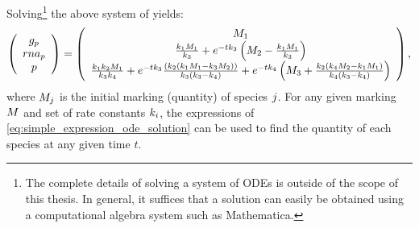 Solving\footnote{The complete details of solving a system of ODEs is outside of the scope of this thesis. In general, it suffices that a solution can easily be obtained using a computational algebra system such as Mathematica\supercite{Wolfram:11Mat}.} the above system of  yields:
\begin{gather}\label{eq:simple_expression_ode_solution}
    \left( \begin{array}{c}
        \con{g_p} \\
        \con{rna_p} \\
        \con{p}
    \end{array} \right) =
%
    \left( \begin{array}{c}
        \markmat_1 \\
        \frac{\condetx{1} \markmat_1}{\condetx{3}} + e^{-t \condetx{3}}\left( \markmat_2-\frac{\condetx{1} \markmat_1}{\condetx{3}} \right) \\
        \frac{\condetx{1} \condetx{2} \markmat_1}{\condetx{3} \condetx{4}} + e^{-t \condetx{3}}\frac{\left(\condetx{2} \left(\condetx{1} \markmat_1-\condetx{3} \markmat_2\right)\right)}{\condetx{3} \left(\condetx{3}-\condetx{4}\right)} + e^{-t \condetx{4}} \left(\markmat_3 + \frac{\condetx{2} \left(\condetx{4} \markmat_2-\condetx{1} \markmat_1\right)}{\condetx{4} \left(\condetx{3}-\condetx{4}\right)}\right)
    \end{array} \right),
\end{gather}
where $M_j$ is the initial marking (\ie quantity) of species $j$. For any given marking $M$ and set of rate constants $k_{i}$, the expressions of \eqref{eq:simple_expression_ode_solution} can be used to find the quantity of each species at any given time $t$.

